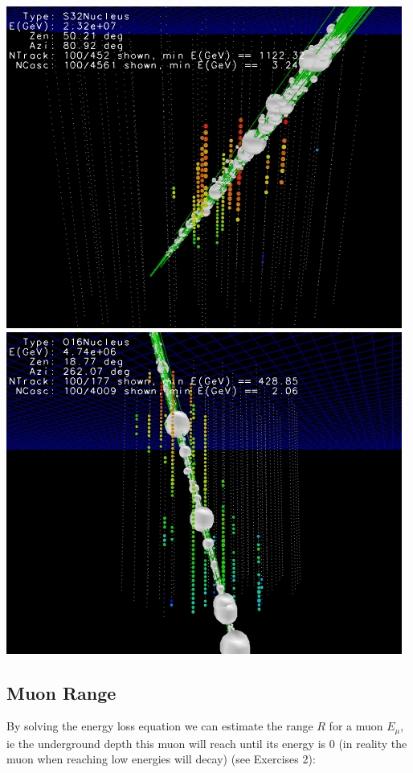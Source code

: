 \documentclass[
  letterpaper,
  DIV=11,
  numbers=noendperiod]{scrreprt}
\begin{document}
\includegraphics{images/musmooth.jpg}
\includegraphics{images/mustochastic.jpg}

\subsection*{Muon Range}\label{muon-range}

By solving the energy loss equation we can estimate the range \(R\) for
a muon \(E_\mu\), ie the underground depth this muon will reach until
its energy is 0 (in reality the muon when reaching low energies will
decay) (see Exercises 2):
\end{document}
